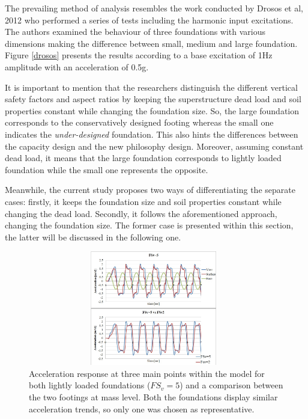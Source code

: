The prevailing method of analysis resembles the work conducted by Drosos et al, 2012 \cite{drosos2012soil} who \mbox{performed} a series of tests including the harmonic input excitations. The authors \mbox{examined} the behaviour of three foundations with various dimensions making the \mbox{difference} between small, medium and large foundation. Figure \ref{drosos} presents the results according to a base excitation of 1Hz amplitude with an acceleration of 0.5g.

It is important to mention that the researchers distinguish the different vertical safety factors and aspect ratios by keeping the superstructure dead load and soil properties constant while changing the foundation size. So, the large foundation corresponds to the \mbox{conservatively} designed footing whereas the small one indicates the \textit{under-designed} foundation. This also hints the differences between the capacity design and the new \mbox{philosophy} design. Moreover, assuming constant dead load, it means that the large foundation corresponds to lightly loaded foundation while the small one represents the opposite. 

Meanwhile, the current study proposes two ways of differentiating the separate cases: firstly, it keeps the foundation size and soil properties constant while changing the dead load. \mbox{Secondly}, it follows the aforementioned approach, changing the foundation size. The former case is \mbox{presented} within this section, the latter will be discussed in the following one.

\begin{figure}[!h]
	\centering
	\includegraphics[width=11cm,height=5cm]{"acc_sin4m2"}
	\caption{Acceleration response at three main points within the model for both lightly loaded foundations ($FS_v=5$) and a comparison between the two footings at mass level. Both the foundations display similar acceleration trends, so only one was chosen as representative. }
	\label{acc4msin}
\end{figure}

